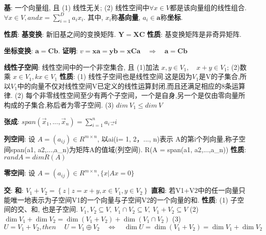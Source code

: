 \documentclass{article}
\begin{document}
        \textbf{基}: 一个向量组, 且 (1) 线性无关; (2) 线性空间中$\forall x \in V$都是该向量组的线性组合. $\forall x \in V, and x = \sum\limits_{i=1}^{D} a_i x_i$. 其中, $x_i$称\textbf{基向量}, $a_i \in \boldsymbol a$称\textbf{坐标}.

            \textbf{性质}: 
                \textbf{基变换}: 新旧基之间的变换矩阵. $\boldsymbol Y = \boldsymbol X \boldsymbol C$
                    \textbf{性质}: 基变换矩阵是非奇异矩阵.

                \textbf{坐标变换}: $\boldsymbol a = \boldsymbol C \boldsymbol b$.
                    \textbf{证明}: $v = \boldsymbol x \boldsymbol a = \boldsymbol y \boldsymbol b = \boldsymbol x \boldsymbol C \boldsymbol a \quad \Rightarrow \quad \boldsymbol a = \boldsymbol C \boldsymbol b$

            
        \textbf{线性子空间}: 线性空间中的一个非空集合, 且 (1)加法 $x,y\in V_1 ,\quad x+y \in V_1$; (2)数乘 $x \in V_1, k x \in V_1$
            \textbf{性质}: 
                (1) 线性子空间也是线性空间.这是因为$V_1$是V的子集合,所以$V_1$中的向量不仅对线性空间V已定义的线性运算封闭,而且还满足相应的8条运算律.
                (2) 每个非零线性空间至少有两个子空间，一个是自身,另一个是仅由零向量所构成的子集合,称后者为零子空间.             
                (3) $dim\ V_1 \le dim\ V$

        \textbf{张成}: $span(\vec x_1,...,\vec x_n ) = {\sum_{i=1}^n a_i \vec_i}$ 
            
        \textbf{列空间}: 设 $A = (a_{ij})\in R^{m×n}$, 以ai(i= 1, 2，..., n)表示
        A的第i个列向量,称子空间span(a1, a2,...,a_n)为矩阵A的值域(列空间). R(A = span(a1, a2,...,a_n))
            \textbf{性质}: $rand A = dim R(A)$

        \textbf{零空间}: 设 $A = (a_{ij})\in R^{m×n}, \{x | Ax = 0\}$
        
        \textbf{交}: 
        \textbf{和}: $V_{1}+V_{2}=\left\{z \mid z=x+y, x \in V_{1}, y \in V_{2}\right\}$
        \textbf{直和}: 若V1+V2中的任一向量只能唯一地表示为子空间V1的一个向量与子空间V2的一个向量的和.
            \textbf{性质}: 
            (1) 子空间的交、和, 也是子空间. $V_1, V_2 \subseteq V,\ V_1 \cap V_2 \subseteq V,\ V_1 + V_2 \subseteq V$
            (2) $\operatorname{dim} V_{1}+\operatorname{dim} V_{2}=\operatorname{dim}\left(V_{1}+V_{2}\right)+\operatorname{dim}\left(V_{1} \cap V_{2}\right)$
            (3)  $U=V_{1} + V_{2}, then\ \quad U=V_{1} \oplus V_{2} \quad \Leftrightarrow \quad \operatorname{dim} U=\operatorname{dim}\left(V_{1}+V_{2}\right)=\operatorname{dim} V_{1}+\operatorname{dim} V_{2} $
\end{document}
